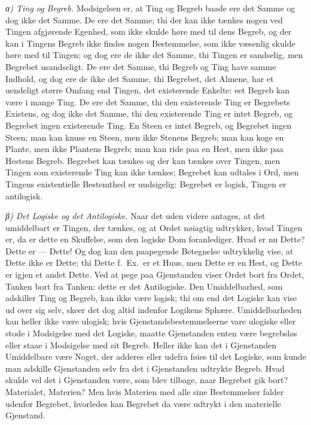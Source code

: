 \documentclass[12pt]{book}
\newcommand{\apage}[1]{\marginnote{\footnotesize\textit{[#1]}}}
\begin{document}
\emph{α) Ting og Begreb.} Modsigelsen er, at Ting og Begreb baade ere det
Samme og dog ikke det Samme. De ere det Samme; thi der kan ikke tænkes
nogen ved Tingen afgjørende Egenhed, som ikke skulde høre med til dens
Begreb, og der kan i Tingens Begreb ikke findes nogen Bestemmelse, som ikke
væsenlig skulde høre med til Tingen; og dog ere de ikke det Samme, thi
Tingen er sandselig, men Begrebet usandseligt. De ere det Samme, thi Begreb
og Ting have samme Indhold, og dog ere de ikke det Samme, thi Begrebet, det
Almene, har et uendeligt større Omfang end Tingen, det existerende Enkelte:
eet Begreb kan være i mange Ting. De ere det Samme, thi den existerende Ting
er Begrebets Existens, og dog ikke det Samme, thi den existerende Ting er
intet Begreb, og Begrebet ingen existerende Ting. En Steen er intet Begreb,
og Begrebet ingen Steen; man kan knuse en Steen, men ikke Stenens Begreb;
man kan koge en Plante, men ikke Plantens Begreb; man kan ride paa en Hest,
men ikke paa Hestens Begreb. Begrebet kan tænkes og der kan tænkes over
Tingen, men Tingen som existerende Ting kan ikke tænkes; Begrebet kan
udtales i Ord, men Tingens existentielle Bestemthed er uudsigelig: Begrebet
er logisk, Tingen er antilogisk.

\emph{β) Det Logiske og det Antilogiske.} Naar det uden videre antages, at
det umiddelbart er Tingen, der tænkes, og at Ordet nøiagtig udtrykker, hvad
\apage{111} Tingen er, da er dette en Skuffelse, som den logiske Dom foranlediger. Hvad
er nu Dette? Dette er --- Dette! Og dog kan den paapegende Betegnelse
udtrykkelig vise, at Dette ikke er Dette; thi Dette f.\ Ex.\ er et Huus,
men Dette er en Hest, og Dette er igjen et andet Dette. Ved at pege paa
Gjenstanden viser Ordet bort fra Ordet, Tanken bort fra Tanken: dette er
det Antilogiske. Den Umiddelbarhed, som adskiller Ting og Begreb, kan ikke
være logisk; thi om end det Logiske kan vise ud over sig selv, skeer det
dog altid indenfor Logikens Sphære. Umiddelbarheden kan heller ikke være
ulogisk; hvis Gjenstandsbestemmelserne vare ulogiske eller stode i
Modsigelse med det Logiske, maatte Gjenstanden enten være begrebsløs eller
staae i Modsigelse med sit Begreb. Heller ikke kan det i Gjenstanden
Umiddelbare være Noget, der adderes eller udefra føies til det Logiske, som
kunde man adskille Gjenstanden selv fra det i Gjenstanden udtrykte Begreb.
Hvad skulde vel det i Gjenstanden være, som blev tilbage, naar Begrebet gik
bort? Materialet, Materien? Men hvis Materien med alle sine Bestemmelser
falder udenfor Begrebet, hvorledes kan Begrebet da være udtrykt i den
materielle Gjenstand.
\end{document}
